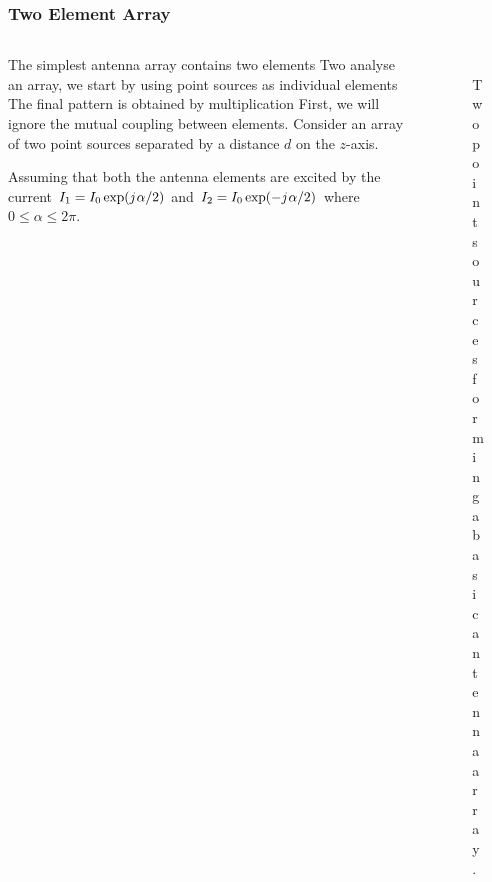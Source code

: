 \documentclass[10pt]{beamer}
\renewcommand{\j}{{j}\mkern1mu} %
\begin{document}
\begin{frame}
    \frametitle{Two Element Array}
    \begin{columns}[T] %
        \begin{column}{.6\textwidth}
            \begin{outline}
                \1 The simplest antenna array contains two elements
                \1 Two analyse an array, we start by using point sources as individual elements
                \2 The final pattern is obtained by multiplication
                \1 First, we will ignore the mutual coupling between elements.
                \1 Consider an array of two point sources separated by a distance $d$ on the $z$-axis.
            \end{outline}
            \begin{outline}
                \1 Assuming that both the antenna elements are excited by the current $I_1 = I_0 \exp (\j \alpha/2)$ and $I_2 = I_0 \exp (-\j \alpha/2)$ where $0 \le \alpha \le 2 \pi$.
            \end{outline}   
        \end{column}
        \begin{column}{.4\textwidth}
            \begin{figure}[T!]
                \centering
                \includegraphics[width=.8\textwidth]{two_elements.pdf}
                \caption{Two point sources forming a basic antenna array.}
            \end{figure}

        \end{column}%
    \end{columns}
\end{frame}
\end{document}
